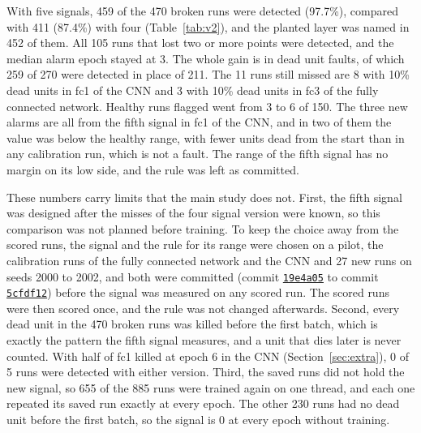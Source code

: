 \documentclass[11pt]{article}
\begin{document}
With five signals, 459 of the 470 broken runs were detected (97.7\%), compared with 411 (87.4\%) with four (Table~\ref{tab:v2}), and the planted layer was named in 452 of them. All 105 runs that lost two or more points were detected, and the median alarm epoch stayed at 3. The whole gain is in dead unit faults, of which 259 of 270 were detected in place of 211. The 11 runs still missed are 8 with 10\% dead units in fc1 of the CNN and 3 with 10\% dead units in fc3 of the fully connected network. Healthy runs flagged went from 3 to 6 of 150. The three new alarms are all from the fifth signal in fc1 of the CNN, and in two of them the value was below the healthy range, with fewer units dead from the start than in any calibration run, which is not a fault. The range of the fifth signal has no margin on its low side, and the rule was left as committed.

These numbers carry limits that the main study does not. First, the fifth signal was designed after the misses of the four signal version were known, so this comparison was not planned before training. To keep the choice away from the scored runs, the signal and the rule for its range were chosen on a pilot, the calibration runs of the fully connected network and the CNN and 27 new runs on seeds 2000 to 2002, and both were committed (commit \href{https://github.com/sohan-bhat/lhd/commit/19e4a05}{\texttt{19e4a05}} to commit \href{https://github.com/sohan-bhat/lhd/commit/5cfdf12}{\texttt{5cfdf12}}) before the signal was measured on any scored run. The scored runs were then scored once, and the rule was not changed afterwards. Second, every dead unit in the 470 broken runs was killed before the first batch, which is exactly the pattern the fifth signal measures, and a unit that dies later is never counted. With half of fc1 killed at epoch 6 in the CNN (Section~\ref{sec:extra}), 0 of 5 runs were detected with either version. Third, the saved runs did not hold the new signal, so 655 of the 885 runs were trained again on one thread, and each one repeated its saved run exactly at every epoch. The other 230 runs had no dead unit before the first batch, so the signal is 0 at every epoch without training.
\end{document}
